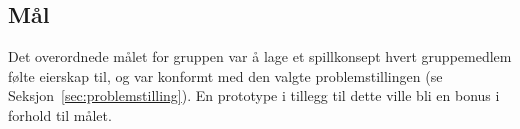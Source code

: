 \subsection{Mål}
Det overordnede målet for gruppen var å lage et spillkonsept hvert
gruppemedlem følte eierskap til, og var konformt med den valgte
problemstillingen (se Seksjon~\ref{sec:problemstilling}). En prototype i
tillegg til dette ville bli en bonus i forhold til målet.
